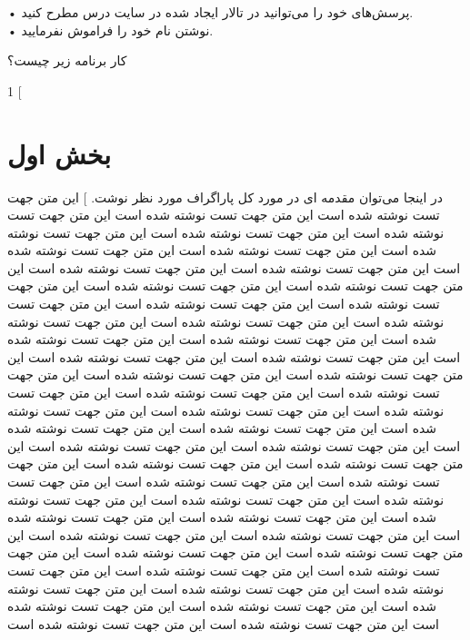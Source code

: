 \documentclass[12pt]{exam}
\newcommand{\class}{درس معماری کامپیوتر پیشرفته}
\begin{document}

\pagestyle{empty}


\pagestyle{head}
\firstpageheader{}{}{}
\runningheader{صفحه \thepage\ از \numpages}{}{\class}
\runningheadrule
\vspace{0pt}

• پرسش‌های خود را می‌توانید در  تالار ایجاد شده در سایت درس مطرح کنید.\\
•  نوشتن نام خود را فراموش نفرمایید.\\



\begin{questions}
	\pointpoints
	
	
	\question
	کار برنامه زیر چیست؟ 
\end{questions}

\begin{multicols}{1}
	[
	\section{بخش اول}
	در اینجا می‌توان مقدمه ای در مورد کل پاراگراف مورد نظر نوشت.
	]
	این متن جهت تست نوشته شده است این متن جهت تست نوشته شده است این متن جهت تست نوشته شده است این متن جهت تست نوشته شده است این متن جهت تست نوشته شده است این متن جهت تست نوشته شده است این متن جهت تست نوشته شده است این متن جهت تست نوشته شده است این متن جهت تست نوشته شده است این متن جهت تست نوشته شده است این متن جهت تست نوشته شده است این متن جهت تست نوشته شده است این متن جهت تست نوشته شده است این متن جهت تست نوشته شده است این متن جهت تست نوشته شده است این متن جهت تست نوشته شده است این متن جهت تست نوشته شده است این متن جهت تست نوشته شده است این متن جهت تست نوشته شده است این متن جهت تست نوشته شده است این متن جهت تست نوشته شده است این متن جهت تست نوشته شده است این متن جهت تست نوشته شده است این متن جهت تست نوشته شده است این متن جهت تست نوشته شده است این متن جهت تست نوشته شده است این متن جهت تست نوشته شده است این متن جهت تست نوشته شده است این متن جهت تست نوشته شده است این متن جهت تست نوشته شده است این متن جهت تست نوشته شده است این متن جهت تست نوشته شده است این متن جهت تست نوشته شده است این متن جهت تست نوشته شده است این متن جهت تست نوشته شده است این متن جهت تست نوشته شده است این متن جهت تست نوشته شده است این متن جهت تست نوشته شده است این متن جهت تست نوشته شده است این متن جهت تست نوشته شده است این متن جهت تست نوشته شده است این متن جهت تست نوشته شده است این متن جهت تست نوشته شده است این متن جهت تست نوشته شده است این متن جهت تست نوشته شده است این متن جهت تست نوشته شده است این متن جهت تست نوشته شده است این متن جهت تست نوشته شده است این متن جهت تست نوشته شده است این متن جهت تست نوشته شده است این متن جهت تست نوشته شده است این متن جهت تست نوشته شده است این متن جهت تست نوشته شده است 
\end{multicols}


\begin{latin}
	
	

\end{latin}
\end{document}
